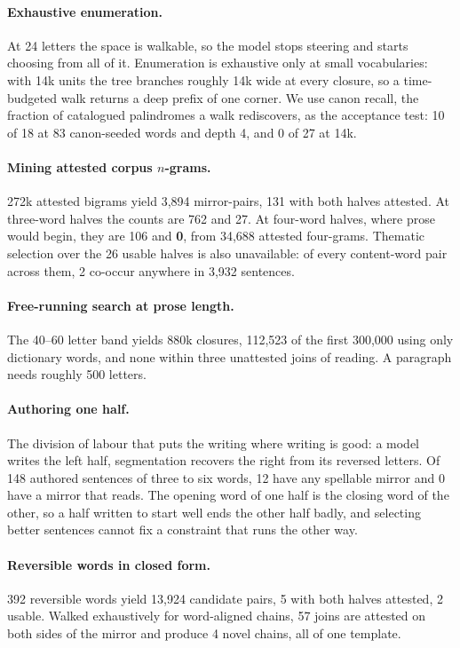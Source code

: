\documentclass[11pt]{article}
\begin{document}
\paragraph{Exhaustive enumeration.}
At 24 letters the space is walkable, so the model stops steering and starts
choosing from all of it. Enumeration is exhaustive only at small vocabularies:
with 14k units the tree branches roughly 14k wide at every closure, so a
time-budgeted walk returns a deep prefix of one corner. We use canon recall,
the fraction of catalogued palindromes a walk rediscovers, as the acceptance
test: 10 of 18 at 83 canon-seeded words and depth 4, and 0 of 27 at 14k.

\paragraph{Mining attested corpus $n$-grams.}
272k attested bigrams yield 3{,}894 mirror-pairs, 131 with both halves attested.
At three-word halves the counts are 762 and 27. At four-word halves, where
prose would begin, they are 106 and \textbf{0}, from 34{,}688 attested
four-grams. Thematic selection over the 26 usable halves is also unavailable:
of every content-word pair across them, 2 co-occur anywhere in 3{,}932
sentences.

\paragraph{Free-running search at prose length.}
The 40--60 letter band yields 880k closures, 112{,}523 of the first 300{,}000
using only dictionary words, and none within three unattested joins of reading.
A paragraph needs roughly 500 letters.

\paragraph{Authoring one half.}
The division of labour that puts the writing where writing is good: a model
writes the left half, segmentation recovers the right from its reversed
letters. Of 148 authored sentences of three to six words, 12 have any spellable
mirror and 0 have a mirror that reads. The opening word of one half is the
closing word of the other, so a half written to start well ends the other half
badly, and selecting better sentences cannot fix a constraint that runs the
other way.

\paragraph{Reversible words in closed form.}
392 reversible words yield 13{,}924 candidate pairs, 5 with both halves
attested, 2 usable. Walked exhaustively for word-aligned chains, 57 joins are
attested on both sides of the mirror and produce 4 novel chains, all of one
template.
\end{document}
